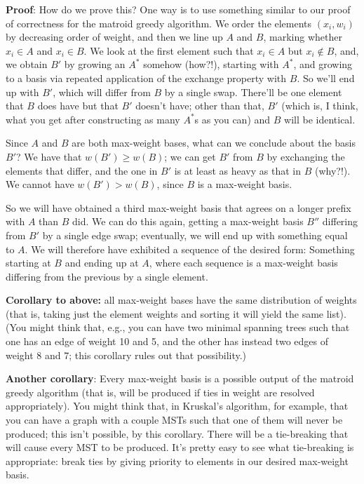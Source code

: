 \documentclass{article}
\begin{document}
\textbf{Proof}: 
How do we prove this?
One way is to use something similar to our proof of correctness for the
matroid greedy algorithm.
We order the elements $(x_i, w_i)$ by decreasing order
of weight, and then we line up $A$ and $B$, marking whether
$x_i \in A$ and $x_i \in B$. We look at the first
element such that $x_i\in A$ but $x_i\not \in B$, and, we obtain
$B'$ by growing an $A^*$ somehow (how?!),
 starting with $A^*$, and growing to a basis via repeated application of the exchange
property with $B$.
So we'll end up with $B'$, which will differ from $B$ by a single swap.
There'll be one element that $B$ does have but that $B'$ doesn't have;
other than that, $B'$ (which is, I think, what you get after constructing
as many $A^*$s as you can) and $B$ will be identical.

Since $A$ and $B$ are both max-weight bases, what can we conclude
about the basis $B'$?
We have that $w(B') \geq w(B)$; we can get $B'$ from $B$ by exchanging
the elements that differ, and the one in $B'$ is at least as heavy as that
in $B$ (why?!).
We cannot have $w(B') > w(B)$, since $B$ is a max-weight basis.

So we will have obtained a third max-weight basis that agrees on a longer
prefix with $A$ than $B$ did.
We can do this again, getting a max-weight basis $B''$ differing from $B'$ by
a single edge swap; eventually, we will end up with something
equal to $A$.
We will therefore have exhibited a sequence of the desired form: Something
starting at $B$ and ending up at $A$, where each sequence is a max-weight basis
differing from the previous by a single element.


\textbf{Corollary to above:} all max-weight bases have the same distribution 
of weights (that is, taking just the element weights and sorting it
will yield the same list).
(You might think that, e.g., you can have two minimal spanning trees
such that one has an edge of weight 10 and 5, and the other has instead
two edges of weight 8 and 7; this corollary rules out that possibility.)

\textbf{Another corollary}: Every max-weight basis is a
possible output of the matroid greedy algorithm (that is, will be produced
if ties in weight are resolved appropriately).
You might think that, in Kruskal's algorithm, for example, that you can
have a graph with a couple MSTs such that one of them will never be produced;
this isn't possible, by this corollary. There will be a tie-breaking that will
cause every MST to be produced.
It's pretty easy to see what tie-breaking is appropriate: break ties by
giving priority to elements in our desired max-weight basis.
\end{document}
